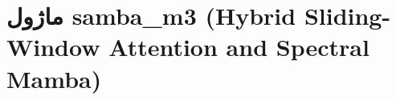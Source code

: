 \section{ماژول samba\_m3 (Hybrid Sliding-Window Attention and Spectral Mamba)}
\label{sec:module_samba_m3}
